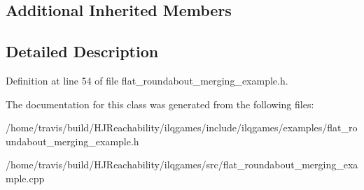\subsection*{Additional Inherited Members}


\subsection{Detailed Description}


Definition at line 54 of file flat\+\_\+roundabout\+\_\+merging\+\_\+example.\+h.



The documentation for this class was generated from the following files\+:\begin{DoxyCompactItemize}
\item 
/home/travis/build/\+H\+J\+Reachability/ilqgames/include/ilqgames/examples/flat\+\_\+roundabout\+\_\+merging\+\_\+example.\+h\item 
/home/travis/build/\+H\+J\+Reachability/ilqgames/src/flat\+\_\+roundabout\+\_\+merging\+\_\+example.\+cpp\end{DoxyCompactItemize}
